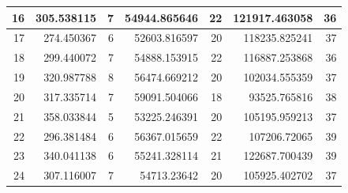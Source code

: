 \begin{table}
\begin{adjustwidth}{}{}
{{\begin{tabular}{|r|r|r|r|r|r|r|}
\hline
16                                         & 305.538115                   & 7                                     & 54944.865646                   & 22                                    & 121917.463058                & 36                                     \\ 
\hline
17                                         & 274.450367                   & 6                                     & 52603.816597                   & 20                                    & 118235.825241                & 37                                     \\ 
\hline
18                                         & 299.440072                   & 7                                     & 54888.153915                   & 22                                    & 116887.253868                & 36                                     \\ 
\hline
19                                         & 320.987788                   & 8                                     & 56474.669212                   & 20                                    & 102034.555359                & 37                                     \\ 
\hline
20                                         & 317.335714                   & 7                                     & 59091.504066                   & 18                                    & 93525.765816                 & 38                                     \\ 
\hline
21                                         & 358.033844                   & 5                                     & 53225.246391                   & 20                                    & 105195.959213                & 37                                     \\ 
\hline
22                                         & 296.381484                   & 6                                     & 56367.015659                   & 22                                    & 107206.72065                 & 39                                     \\ 
\hline
23                                         & 340.041138                   & 6                                     & 55241.328114                   & 21                                    & 122687.700439                & 39                                     \\ 
\hline
24                                         & 307.116007                   & 7                                     & 54713.23642                    & 20                                    & 105925.402702                & 37                                     \\ 

\end{tabular}}}
\end{adjustwidth}
\end{table}
